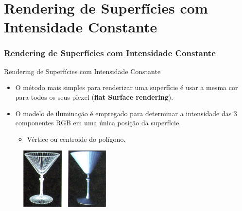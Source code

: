 \documentclass{beamer}
\begin{document}
\section{Rendering de Superfícies com Intensidade Constante}
\begin{frame}
\frametitle{Rendering de Superfícies com Intensidade Constante}

		\begin{block}{Rendering de Superfícies com Intensidade Constante}
		\begin{itemize}
			\item O método mais simples para renderizar uma superfície é usar a mesma cor para todos os seus piexel (\textbf{flat Surface rendering}).
			\item O modelo de iluminação é empregado para determinar a intensidade das 3 componentes RGB em uma única posição da superfície.
			\begin{itemize}
				\item Vértice ou centroide do polígono.
			\end{itemize}						 
		\end{itemize}
	\end{block}
	
		\begin{figure}[!h]
			\begin{center}
			\includegraphics[width=0.4\textwidth]{Figures/FlaSur}
			\end{center}
		\end{figure}
	
\end{frame}
\end{document}
